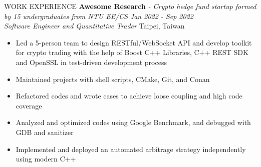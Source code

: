 \documentclass{resume} %
\begin{document}
\begin{rSection}{WORK EXPERIENCE} 
\textbf{Awesome Research} \textit{- Crypto hedge fund startup formed by 15 undergraduates from NTU EE/CS} \hfill \textit{Jan 2022 - Sep 2022} \\  
\textit{Software Engineer and Quantitative Trader}  \hfill {Taipei, Taiwan} 
    \begin{itemize}
        \item Led a 5-person team to design RESTful/WebSocket API and develop toolkit for crypto trading with the help of Boost C++ Libraries, C++ REST SDK and OpenSSL in test-driven development process
        \item Maintained projects with shell scripts, CMake, Git, and Conan
        \item Refactored codes and wrote cases to achieve loose coupling and high code coverage
        \item Analyzed and optimized codes using Google Benchmark, and debugged with GDB and sanitizer
        \item Implemented and deployed an automated arbitrage strategy independently using modern C++
    \end{itemize}




    
\end{rSection} 
\end{document}
